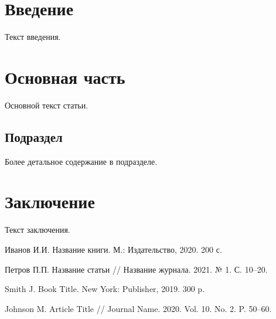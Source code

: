 \documentclass[12pt]{article}
\begin{document}



\vspace{1em}


\section{Введение}

Текст введения.

\section{Основная часть}

Основной текст статьи.

\subsection{Подраздел}

Более детальное содержание в подразделе.

\section{Заключение}

Текст заключения.


\bibliographyru

\bibliosectioncyrillic
\begin{bibliolist}
\item Иванов И.И. Название книги. М.: Издательство, 2020. 200 с.
\item Петров П.П. Название статьи // Название журнала. 2021. № 1. С. 10--20.
\end{bibliolist}

\bibliosectionlatin
\begin{bibliolist}
\item Smith J. Book Title. New York: Publisher, 2019. 300 p.
\item Johnson M. Article Title // Journal Name. 2020. Vol. 10. No. 2. P. 50--60.
\end{bibliolist}
\end{document}
